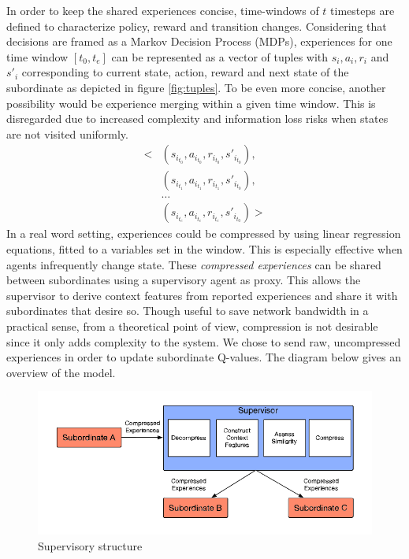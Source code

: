\documentclass[letterpaper]{article}
\begin{document}
In order to keep the shared experiences concise, time-windows of $t$ timesteps are defined to characterize policy, reward and transition changes. Considering that decisions are framed as a Markov Decision Process (MDPs), experiences for one time window $[t_{0}, t_{e}]$ can be represented as a vector of tuples with $s_i, a_i, r_i$ and $s'_i$ corresponding to current state, action, reward and next state of the subordinate as depicted in figure \ref{fig:tuples}. To be even more concise, another possibility would be experience merging within a given time window. This is disregarded due to increased complexity and information loss risks when states are not visited uniformly.
\vspace{\baselineskip}
\begin{align*}
 \biggl<
  & (s_{i_{t_0}},a_{i_{t_0}},r_{i_{t_0}},s'_{i_{t_0}}), \\
  & (s_{i_{t_1}},a_{i_{t_1}},r_{i_{t_1}},s'_{i_{t_0}}), \\
  & \hdots                                              \\
  & (s_{i_{t_e}},a_{i_{t_e}},r_{i_{t_e}},s'_{i_{t_0}})
 \biggr>
\end{align*}
\begingroup\vspace*{-\baselineskip}
 \label{fig:tuples}
\vspace*{\baselineskip}\endgroup
In a real word setting, experiences could be compressed by using linear regression equations, fitted to a variables set in the window. This is especially effective when agents infrequently change state. These \textit{compressed experiences} can be shared between subordinates using a supervisory agent as proxy. This allows the supervisor to derive context features from reported experiences and share it with subordinates that desire so. Though useful to save network bandwidth in a practical sense, from a theoretical point of view, compression is not desirable since it only adds complexity to the system. We chose to send raw, uncompressed experiences in order to update subordinate Q-values. The diagram below gives an overview of the model.
\begin{figure}[ht]
 \begin{center}
  \includegraphics[width=\linewidth]{figures/diagram}
  \caption{Supervisory structure \citep{garant2015accelerating}}
  \label{fig:diagram}
 \end{center}
\end{figure}
\end{document}
